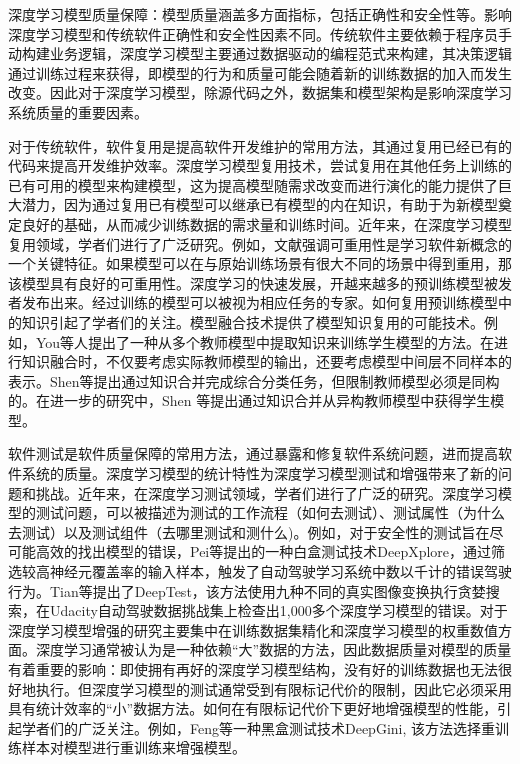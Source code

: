 \documentclass[fontset=macnew,UTF8]{article} %
\begin{document}
深度学习模型质量保障：模型质量涵盖多方面指标，包括正确性和安全性等\cite{landscapes}。影响深度学习模型和传统软件正确性和安全性因素不同。传统软件主要依赖于程序员手动构建业务逻辑，深度学习模型主要通过数据驱动的编程范式来构建，其决策逻辑通过训练过程来获得，即模型的行为和质量可能会随着新的训练数据的加入而发生改变\cite{amershi2019software}。因此对于深度学习模型，除源代码之外，数据集和模型架构是影响深度学习系统质量的重要因素。

对于传统软件，软件复用是提高软件开发维护的常用方法，其通过复用已经已有的代码来提高开发维护效率\cite{poulin1996measuring}。深度学习模型复用技术，尝试复用在其他任务上训练的已有可用的模型来构建模型，这为提高模型随需求改变而进行演化的能力提供了巨大潜力，因为通过复用已有模型可以继承已有模型的内在知识，有助于为新模型奠定良好的基础，从而减少训练数据的需求量和训练时间。近年来，在深度学习模型复用领域，学者们进行了广泛研究。例如，文献\cite{zhou2016learnware}强调可重用性是学习软件新概念的一个关键特征。如果模型可以在与原始训练场景有很大不同的场景中得到重用，那该模型具有良好的可重用性。深度学习的快速发展，开越来越多的预训练模型被发者发布出来。经过训练的模型可以被视为相应任务的专家\cite{yang2017deep}。如何复用预训练模型中的知识引起了学者们的关注。模型融合技术提供了模型知识复用的可能技术。例如，You等人\cite{you2017learning}提出了一种从多个教师模型中提取知识来训练学生模型的方法。在进行知识融合时，不仅要考虑实际教师模型的输出，还要考虑模型中间层不同样本的表示。Shen等\cite{shen2019amalgamating}提出通过知识合并完成综合分类任务，但限制教师模型必须是同构的。在进一步的研究中，Shen 等\cite{shen2019customizing}提出通过知识合并从异构教师模型中获得学生模型。

软件测试是软件质量保障的常用方法，通过暴露和修复软件系统问题，进而提高软件系统的质量\cite{landscapes}。深度学习模型的统计特性为深度学习模型测试和增强带来了新的问题和挑战。近年来，在深度学习测试领域，学者们进行了广泛的研究。深度学习模型的测试问题，可以被描述为测试的工作流程（如何去测试）、测试属性（为什么去测试）以及测试组件（去哪里测试和测什么)。例如，对于安全性的测试旨在尽可能高效的找出模型的错误，Pei等\cite{pei2017deepxplore}提出的一种白盒测试技术DeepXplore，通过筛选较高神经元覆盖率的输入样本，触发了自动驾驶学习系统中数以千计的错误驾驶行为。Tian等\cite{tian2018deeptest}提出了DeepTest，该方法使用九种不同的真实图像变换执行贪婪搜索，在Udacity自动驾驶数据挑战集上检查出1,000多个深度学习模型的错误。对于深度学习模型增强的研究主要集中在训练数据集精化和深度学习模型的权重数值方面\cite{shen2020mcp}。深度学习通常被认为是一种依赖“大”数据的方法，因此数据质量对模型的质量有着重要的影响：即使拥有再好的深度学习模型结构，没有好的训练数据也无法很好地执行。但深度学习模型的测试通常受到有限标记代价的限制，因此它必须采用具有统计效率的“小”数据方法\cite{Boosting}。如何在有限标记代价下更好地增强模型的性能，引起学者们的广泛关注。例如，Feng等\cite{feng2020deepgini}一种黑盒测试技术DeepGini, 该方法选择重训练样本对模型进行重训练来增强模型。
\end{document}
